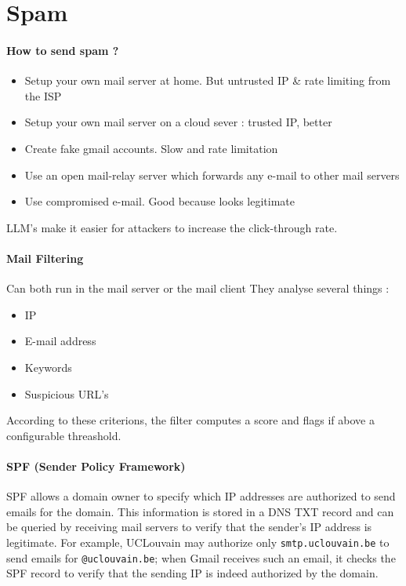 \section{Spam }

\paragraph{How to send spam ?}
\begin{itemize}
    \item Setup your own mail server at home. But untrusted IP \& rate limiting from the ISP
    \item Setup your own mail server on a cloud sever : trusted IP, better
    \item Create fake gmail accounts. Slow and rate limitation
    \item Use an open mail-relay server which forwards any e-mail to other mail servers
    \item Use compromised e-mail. Good because looks legitimate
\end{itemize}

LLM's make it easier for attackers to increase the click-through rate.

\paragraph{Mail Filtering}
Can both run in the mail server or the mail client
They analyse several things : 
\begin{itemize}
    \item IP 
    \item E-mail address 
    \item Keywords
    \item Suspicious URL's
\end{itemize}
According to these criterions, the filter computes a score and flags if above a configurable threashold.



\paragraph{SPF (Sender Policy Framework)}
SPF allows a domain owner to specify which IP addresses are authorized to send emails for the domain. This information is stored in a DNS TXT record and can be queried by receiving mail servers to verify that the sender's IP address is legitimate. For example, UCLouvain may authorize only \texttt{smtp.uclouvain.be} to send emails for \texttt{@uclouvain.be}; when Gmail receives such an email, it checks the SPF record to verify that the sending IP is indeed authorized by the domain.

